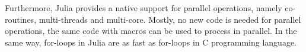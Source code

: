 Furthermore, Julia provides a native support for parallel operations, namely co-routines, multi-threads and multi-core. Mostly, no new code is needed for parallel operations, the same code with macros can be used to process in parallel. In the same way, for-loops in Julia are as fast as for-loops in C programming language. 
